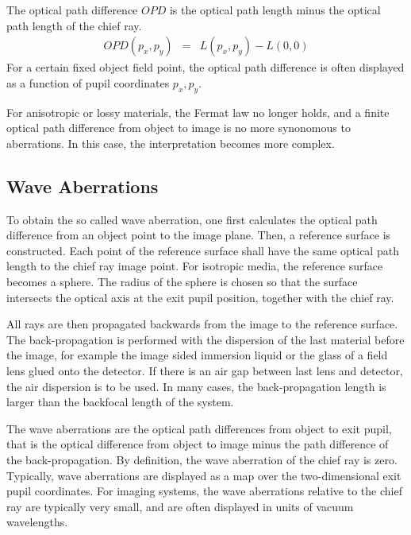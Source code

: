 \documentclass[12pt,a4paper,twoside,openright,BCOR10mm,headsepline,titlepage,abstracton,chapterprefix,final]{scrreprt}
\begin{document}
The optical path difference $OPD$ is the optical path length minus the optical path length of the chief ray.
\begin{eqnarray}
 OPD(p_x,p_y) &=& L(p_x,p_y) - L(0,0)
\end{eqnarray}
For a certain fixed object field point, the optical path difference is often displayed as a function of pupil coordinates $p_x,p_y$.

For anisotropic or lossy materials, the Fermat law no longer holds, and a finite optical path difference from object to image is no more synonomous to aberrations.
In this case, the interpretation becomes more complex.

\subsection{Wave Aberrations}
To obtain the so called wave aberration, one first calculates the optical path difference from an object point to the image plane.
Then, a reference surface is constructed. 
Each point of the reference surface shall have the same optical path length to the chief ray image point.
For isotropic media, the reference surface becomes a sphere.
The radius of the sphere is chosen so that the surface intersects the optical axis at the exit pupil position, together with the chief ray.

All rays are then propagated backwards from the image to the reference surface.
The back-propagation is performed with the dispersion of the last material before the image, 
for example the image sided immersion liquid or the glass of a field lens glued onto the detector.
If there is an air gap between last lens and detector, the air dispersion is to be used.
In many cases, the back-propagation length is larger than the backfocal length of the system.

The wave aberrations are the optical path differences from object to exit pupil, 
that is the optical difference from object to image minus the path difference of the back-propagation.
By definition, the wave aberration of the chief ray is zero.
Typically, wave aberrations are displayed as a map over the two-dimensional exit pupil coordinates.
For imaging systems, the wave aberrations relative to the chief ray are typically very small, and are often displayed in units of vacuum wavelengths.
\end{document}
